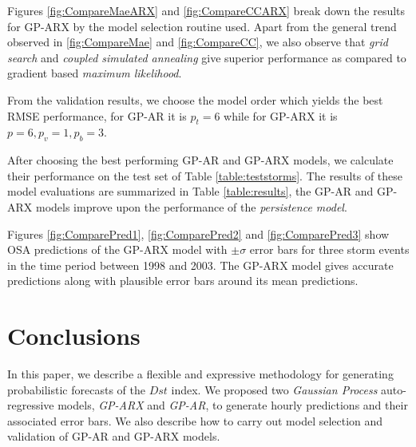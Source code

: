 Figures \ref{fig:CompareMaeARX} and \ref{fig:CompareCCARX} break down the results for GP-ARX by the model selection routine used. Apart from the general trend observed in \ref{fig:CompareMae} and \ref{fig:CompareCC}, we also observe that \emph{grid search} and \emph{coupled simulated annealing} give superior performance as compared to gradient based \emph{maximum likelihood}.

From the validation results, we choose the model order which yields the best RMSE performance, for GP-AR it is $p_t = 6$ while for GP-ARX it is $p = 6, p_v = 1, p_b = 3$.

After choosing the best performing GP-AR and GP-ARX models, we calculate their performance on the test set of Table \ref{table:teststorms}. The results of these model evaluations are summarized in Table \ref{table:results}, the GP-AR and GP-ARX models improve upon the performance of the \emph{persistence model}.

Figures \ref{fig:ComparePred1}, \ref{fig:ComparePred2} and \ref{fig:ComparePred3} show OSA predictions of the GP-ARX model with $\pm \sigma$ error bars for three storm events in the time period between 1998 and 2003. The GP-ARX model gives accurate predictions along with plausible error bars around its mean predictions.

\section{Conclusions}

In this paper, we describe a flexible and expressive methodology for generating probabilistic forecasts of the $Dst$ index. We proposed two \emph{Gaussian Process} auto-regressive models, \emph{GP-ARX} and \emph{GP-AR}, to generate hourly predictions and their associated error bars. We also describe how to carry out model selection and validation of GP-AR and GP-ARX models.


